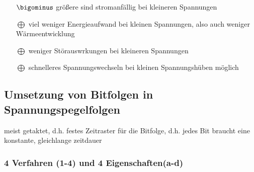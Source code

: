 \documentclass[10pt,a4paper]{scrartcl}
\begin{document}
\begin{itemize}
	\item[$\bigominus$] größere sind stromanfällig bei kleineren Spannungen
	\item[$\bigoplus$] viel weniger Energieaufwand bei kleinen Spannungen, also auch weniger Wärmeentwicklung
	\item[$\bigoplus$] weniger Störauswrkungen bei kleineren Spannungen
	\item[$\bigoplus$] schnelleres Spannungswechseln bei kleinen Spannungshüben möglich
\end{itemize}

\subsection{Umsetzung von Bitfolgen in Spannungspegelfolgen}
\hspace*{2em} meist getaktet, d.h. festes Zeitraster für die Bitfolge, d.h. jedes Bit braucht eine konstante, gleichlange zeitdauer



\subsubsection*{4 Verfahren (1-4) und 4 Eigenschaften(a-d)}
\end{document}
